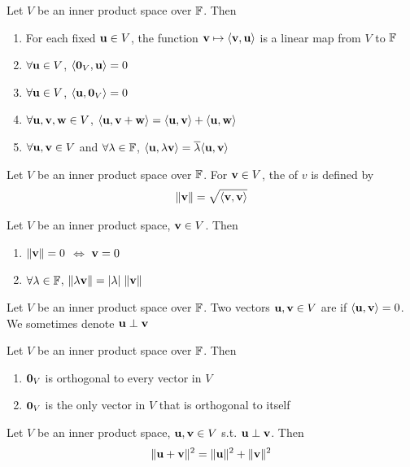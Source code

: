 \documentclass[aspectratio=169]{beamer}
\begin{document}
\begin{frame}
\begin{importanttheorem}
Let $V$ be an inner product space over $\mathbb{F}$. Then
\begin{enumerate}
\item For each fixed $\mathbf{u}\in V$, the function $\mathbf{v}\mapsto \langle \mathbf{v},\mathbf{u}\rangle$ is a linear map from $V$ to $\mathbb{F}$
\item $\forall \mathbf{u}\in V$, $\langle \b0_V,\bu\rangle =0$
\item $\forall \mathbf{u}\in V$, $\langle \bu,\b0_V\rangle =0$
\item $\forall \mathbf{u},\mathbf{v},\mathbf{w}\in V$, $\langle \mathbf{u},\mathbf{v}+\mathbf{w}\rangle = \langle \mathbf{u},\mathbf{v}\rangle + \langle \mathbf{u},\mathbf{w}\rangle$
\item $\forall \mathbf{u},\mathbf{v}\in V$ and $\forall\lambda\in\mathbb{F}$, $\langle \mathbf{u},\lambda \mathbf{v}\rangle = \overline{\lambda} \langle \mathbf{u},\mathbf{v}\rangle$
\end{enumerate} 
\end{importanttheorem}
\end{frame}


\begin{frame}
\begin{definition}[Norm]
Let $V$ be an inner product space over $\mathbb{F}$. For $\mathbf{v}\in V$, the  of $v$ is defined by
\[
\|\mathbf{v}\|=\sqrt{\langle \mathbf{v},\mathbf{v}\rangle}
\]
\end{definition}
\vfill
\begin{theorem}
Let $V$ be an inner product space, $\mathbf{v}\in V$. Then
\begin{enumerate}
\item $\|\mathbf{v}\|=0$ $\Leftrightarrow$ $\mathbf{v}=0$
\item $\forall \lambda\in\mathbb{F}$, $\|\lambda \mathbf{v}\|=|\lambda|\;\|\mathbf{v}\|$
\end{enumerate}
\end{theorem}
\end{frame}



\begin{frame}
\begin{definition}[Orthogonality]
Let $V$ be an inner product space over $\mathbb{F}$. Two vectors $\mathbf{u},\mathbf{v}\in V$ are  if $\langle \mathbf{u},\mathbf{v}\rangle =0$. We sometimes denote $\mathbf{u}\perp \mathbf{v}$
\end{definition}
\begin{importanttheorem}
Let $V$ be an inner product space over $\mathbb{F}$. Then
\begin{enumerate}
\item $\b0_V$ is orthogonal to every vector in $V$
\item $\b0_V$ is the only vector in $V$ that is orthogonal to itself 
\end{enumerate}
\end{importanttheorem}
\begin{importanttheorem}
Let $V$ be an inner product space, $\mathbf{u},\mathbf{v}\in V$ s.t. $\mathbf{u}\perp\mathbf{v}$. Then
\[
\|\mathbf{u}+\mathbf{v}\|^2=\|\mathbf{u}\|^2+\|\mathbf{v}\|^2
\]
\end{importanttheorem}
\end{frame}
\end{document}
